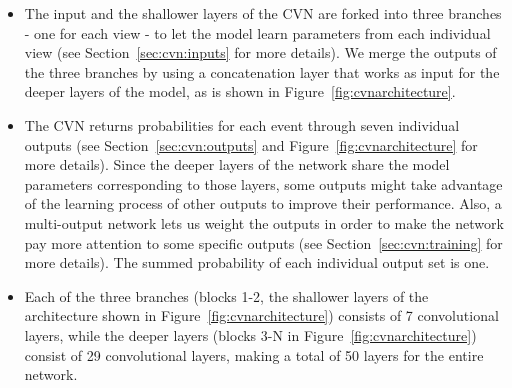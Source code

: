 \begin{itemize}
    \item The input and the shallower layers of the CVN are forked into three branches - one for each view - to let the model learn parameters from each individual view (see Section~\ref{sec:cvn:inputs} for more details). We merge the outputs of the three branches by using a concatenation layer that works as input for the deeper layers of the model, as is shown in Figure~\ref{fig:cvnarchitecture}.
    
    \item The CVN returns probabilities for each event through seven individual outputs (see Section~\ref{sec:cvn:outputs} and Figure~\ref{fig:cvnarchitecture} for more details). Since the deeper layers of the network share the model parameters corresponding to those layers, some outputs might take advantage of the learning process of other outputs to improve their performance. Also, a multi-output network lets us weight the outputs in order to make the network pay more attention to some specific outputs (see Section~\ref{sec:cvn:training} for more details). The summed probability of each individual output set is one.
    
    \item Each of the three branches (blocks 1-2, the shallower layers of the architecture shown in Figure~\ref{fig:cvnarchitecture}) consists of 7 convolutional layers, while the deeper layers (blocks 3-N in Figure~\ref{fig:cvnarchitecture}) consist of 29 convolutional layers, making a total of 50 layers for the entire network.

\end{itemize}

